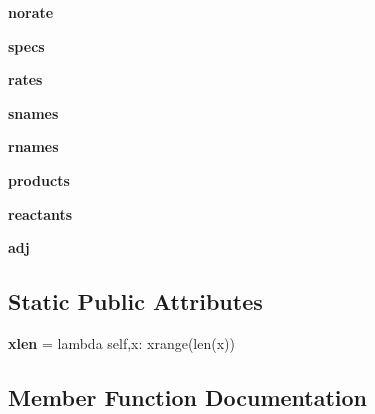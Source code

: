 \begin{DoxyCompactItemize}
{\bfseries norate}
\item 
\mbox{\label{classexplore__dsmacc_1_1new_a04de109168f262d8cba370d0c0a848fc}} 
{\bfseries specs}
\item 
\mbox{\label{classexplore__dsmacc_1_1new_a1cf0b78e0ae4c1ea2f2892909bd85fd8}} 
{\bfseries rates}
\item 
\mbox{\label{classexplore__dsmacc_1_1new_af8b309d7c9969eef024a73d2aec48126}} 
{\bfseries snames}
\item 
\mbox{\label{classexplore__dsmacc_1_1new_a43c245b0b25f11a931321c1d2f5b40ba}} 
{\bfseries rnames}
\item 
\mbox{\label{classexplore__dsmacc_1_1new_a1f767e02c52c17946323545fdcf63e93}} 
{\bfseries products}
\item 
\mbox{\label{classexplore__dsmacc_1_1new_ad57b169d88d5af0b089a5520bf6f2859}} 
{\bfseries reactants}
\item 
\mbox{\label{classexplore__dsmacc_1_1new_a6cb8545b60ac95f5f33445e5f936502b}} 
{\bfseries adj}
\end{DoxyCompactItemize}
\subsection*{Static Public Attributes}
\begin{DoxyCompactItemize}
\item 
\mbox{\label{classexplore__dsmacc_1_1new_adf18d43d7cae92cfc36c39b7ef0ca424}} 
{\bfseries xlen} = lambda self,x\+: xrange(len(x))
\end{DoxyCompactItemize}


\subsection{Member Function Documentation}
\mbox{\label{classexplore__dsmacc_1_1new_acc9266b7b7ae7a41e337bd755288a60b}} 
